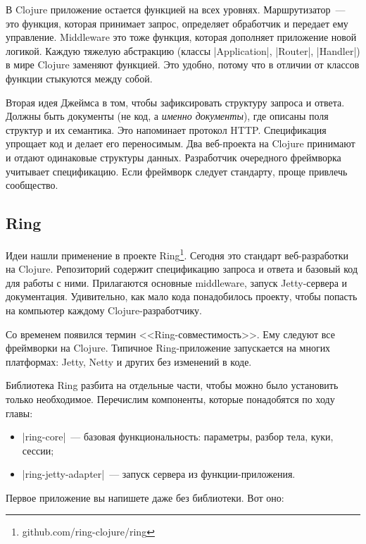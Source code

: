 В Clojure приложение остается функцией на всех уровнях. Маршрутизатор~--- это
функция, которая принимает запрос, определяет обработчик и передает ему
управление. Middleware это тоже функция, которая дополняет приложение новой
логикой. Каждую тяжелую абстракцию (классы \spverb|Application|,
\spverb|Router|, \spverb|Handler|) в мире Clojure заменяют функцией. Это удобно,
потому что в отличии от классов функции стыкуются между собой.

Вторая идея Джеймса в том, чтобы зафиксировать структуру запроса и
ответа. Должны быть документы (не код, а \emph{именно документы}), где описаны
поля структур и их семантика. Это напоминает протокол HTTP. Спецификация
упрощает код и делает его переносимым. Два веб-проекта на Clojure принимают и
отдают одинаковые структуры данных. Разработчик очередного фреймворка учитывает
спецификацию. Если фреймворк следует стандарту, проще привлечь сообщество.

\subsection{Ring}

Идеи нашли применение в проекте Ring\footnote{github.com/ring-clojure/ring}.
Сегодня это стандарт веб-разработки на Clojure. Репозиторий содержит спецификацию
запроса и ответа и базовый код для работы с ними. Прилагаются основные
middleware, запуск Jetty-сервера и документация. Удивительно, как мало кода
понадобилось проекту, чтобы попасть на компьютер каждому Clojure-разработчику.

Со временем появился термин <<Ring-совместимость>>. Ему следуют все
фреймворки на Clojure. Типичное Ring-приложение запускается на многих платформах:
Jetty, Netty и других без изменений в коде.

Библиотека Ring разбита на отдельные части, чтобы можно было установить только
необходимое. Перечислим компоненты, которые понадобятся по ходу главы:


\begin{itemize}
\item
  \spverb|ring-core|~--- базовая функциональность: параметры, разбор тела, куки, сессии;

\item
  \spverb|ring-jetty-adapter|~--- запуск сервера из функции-приложения.

\end{itemize}

Первое приложение вы напишете даже без библиотеки. Вот оно:

